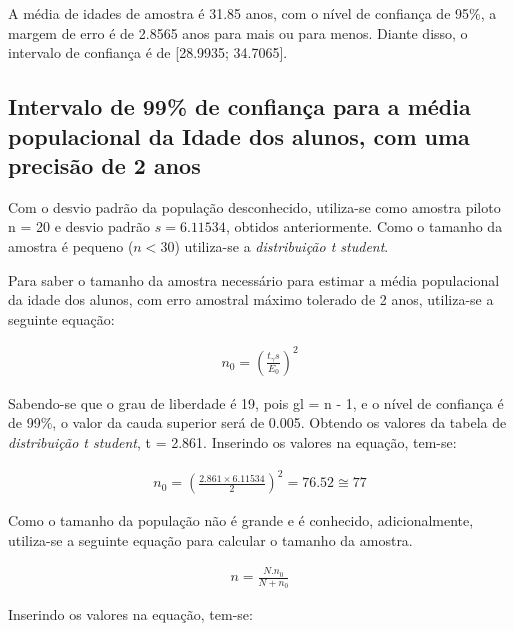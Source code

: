 	A média de idades de amostra é \num{31,85} anos, com o nível de confiança de
	95\%, a margem de erro é de \num{2,8565} anos para mais ou para menos. Diante
	disso, o intervalo de confiança é de [\num{28,9935}; \num{34,7065}].

\subsection{Intervalo de 99\% de confiança para a média populacional da Idade dos alunos, com uma precisão de 2 anos}

	Com o desvio padrão da população desconhecido, utiliza-se como amostra
	piloto n = 20 e desvio padrão $s = \num{6,11534}$, obtidos anteriormente. Como o
	tamanho da amostra é pequeno ($n < 30$) utiliza-se a
	\textit{distribuição t student}.

	Para saber o tamanho da amostra necessário para estimar a média
	populacional da idade dos alunos, com erro amostral máximo tolerado de 2
	anos, utiliza-se a seguinte equação:

	\begin{align}
		\label{eq:dois-b-expr1}
		 n_0 = \left (\frac{t_\gamma s}{E_0} \right)^2
	\end{align}

	Sabendo-se que o grau de liberdade é 19, pois gl = n - 1, e o nível de
	confiança é de 99\%, o valor da cauda superior será de \num{0,005}. Obtendo os
	valores da tabela de \textit{distribuição t student}, t = \num{2,861}.
	Inserindo os valores na equação, tem-se:

	\begin{align*}
		n_0 = \left (\frac{\num{2,861} \times \num{6,11534}}{2} \right)^2 = \num{76,52} \cong 77
	\end{align*}

	Como o tamanho da população não é grande e é conhecido, adicionalmente,
	utiliza-se a seguinte equação para calcular o tamanho da amostra.

	\begin{align}
		\label{eq:dois-b-expr2}
		n = \frac{N . n_0}{N + n_0}
	\end{align}

	Inserindo os valores na equação, tem-se:

